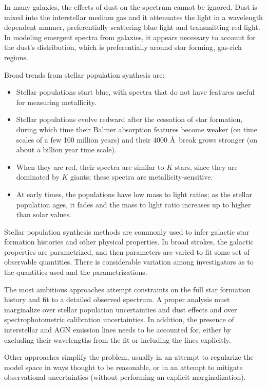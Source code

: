 In many galaxies, the effects of dust on the spectrum cannot be
ignored. Dust is mixed into the interstellar medium gas and it
attenuates the light in a wavelength dependent manner, preferentially
scattering blue light and transmitting red light. In modeling emergent
spectra from galaxies, it appears necessary to account for the dust's
distribution, which is preferentially around star forming, gas-rich
regions. 

Broad trends from stellar population synthesis are:
\begin{itemize}
\item Stellar populations start blue, with spectra that do not
have features useful for measuring metallicity.
\item Stellar populations evolve redward after the cessation of star
formation, during which time their Balmer absorption features become
weaker (on time scales of a few 100 million years) and their 4000 \AA\
break grows stronger (on about a billion year time scale).
\item When they are red, their spectra are similar to $K$ stars, since
they are dominated by $K$ giants; these spectra are
metallicity-sensitive.
\item At early times, the populations have low mass to light ratios;
as the stellar population ages, it fades and the mass to light ratio
increases up to higher than solar values.
\end{itemize}

Stellar population synthesis methods are commonly used to infer
galactic star formation histories and other physical properties.
In broad strokes, the galactic properties are parametrized, and then
parameters are varied to fit some set of observable quantities. There
is considerable variation among investigators as to the quantities
used and the parametrizations. 

The most ambitious approaches attempt constraints on the full star
formation history and fit to a detailed observed spectrum. A proper
analysis must marginalize over stellar population uncertainties and
dust effects and over spectrophotometric calibration uncertainties. In
addition, the presence of interstellar and AGN emission lines needs to
be accounted for, either by excluding their wavelengths from the fit
or including the lines explicitly.

Other approaches simplify the problem, usually in an attempt to
regularize the model space in ways thought to be reasonable, or in an
attempt to mitigate observational uncertainties (without performing an
explicit marginalization).

